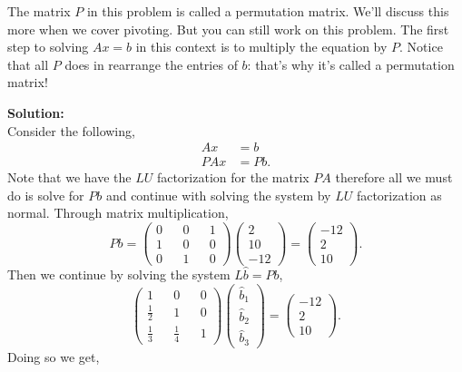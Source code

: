\documentclass[12pt]{article}
\makeatletter
\theoremstyle{homework}
\newenvironment{exercise}[1]
{\def\@currentlabel{#1}\exercisecore}
{\endexercisecore}
\newcommand{\localhead}[1]{\par\smallskip\noindent\textbf{#1}\nobreak\\}%
\newcommand\solution{\localhead{Solution:}}
\makeatother
\begin{document}
\begin{exercise}{Problem 7.4}  The matrix $P$ in this
problem is called a permutation matrix.  We'll discuss this more when we
cover pivoting.  But you can still work on this problem. The
first step to solving $Ax=b$ in this context is to multiply the equation
by $P$.  Notice that all $P$ does in rearrange the entries of $b$: that's
why it's called a permutation matrix!\\

\solution Consider the following,
\begin{align*}
	Ax &= b\\
	PAx &= Pb.
\end{align*}
Note that we have the $LU$ factorization for the matrix $PA$ therefore all we must do is solve for $Pb$ and
continue with solving the system by $LU$ factorization as normal. Through matrix multiplication,
\begin{equation*}
	Pb = \begin{pmatrix}
		0 &&0 &&1\\ 
		1 &&0&& 0\\
		0 &&1 &&0
	\end{pmatrix}
	\begin{pmatrix}
		2\\
		10\\
		-12
	\end{pmatrix}
	 = 
	 \begin{pmatrix}
		-12\\
		2\\
		10
	\end{pmatrix}.
\end{equation*}
Then we continue by solving the system $L\hat{b} =Pb$,
\begin{equation*}
	\begin{pmatrix}
		1 &&0 &&0\\ 
		\frac{1}{2} &&1&& 0\\
		\frac{1}{3} &&\frac{1}{4}&&1
	\end{pmatrix}
	\begin{pmatrix}
		\hat{b}_1\\
		\hat{b}_2\\
		\hat{b}_3
	\end{pmatrix} = 
	\begin{pmatrix}
		-12\\
		2\\
		10
	\end{pmatrix}.
\end{equation*}
Doing so we get, 
\begin{equation*}

\end{equation*}
\end{exercise}
\end{document}
